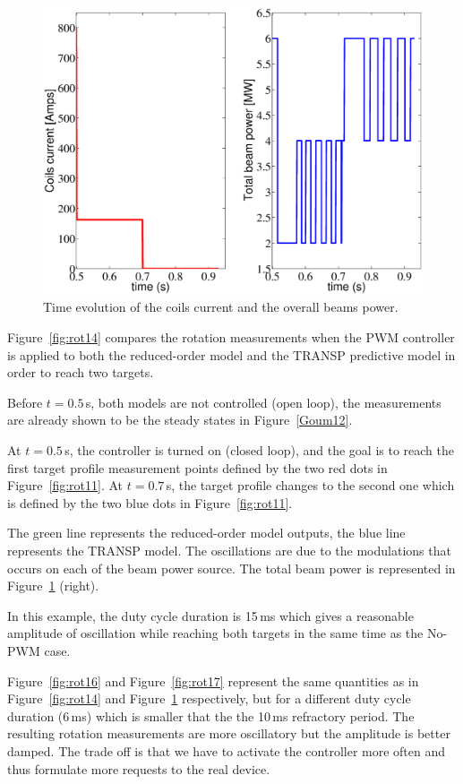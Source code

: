 \documentclass[12pt]{iopart}
\begin{document}
\begin{figure}
\centering
\includegraphics[width=\linewidth]{imene_figs/Goum15l}
\caption{Time evolution of the coils current and the overall beams power. }
\label{fig:rot15}
\end{figure}

Figure~\ref{fig:rot14} compares the rotation measurements when the PWM controller is applied to both the reduced-order model and the TRANSP predictive model in order to reach two targets.

Before $t=0.5$\,s, both models are not controlled (open loop), the measurements are already shown to be the steady states in Figure~\ref{Goum12}.

At $t = 0.5$\,s, the controller is turned on (closed loop), and the goal is to reach the first target profile measurement points defined by the two red dots in Figure~\ref{fig:rot11}. At $t = 0.7$\,s, the  target profile changes to the second one which is defined by the two blue dots in Figure~\ref{fig:rot11}.

The green line represents the reduced-order model outputs, the blue line represents the TRANSP model. The oscillations are due to the modulations that occurs on each of the beam power source. The total beam power is represented in Figure~\ref{fig:rot15} (right).

In this example, the duty cycle duration is 15\,ms which gives a reasonable amplitude of oscillation while reaching both targets in the same time as the No-PWM case.

Figure~\ref{fig:rot16} and Figure~\ref{fig:rot17} represent the same quantities as in Figure~\ref{fig:rot14} and Figure~\ref{fig:rot15} respectively, but for a different duty cycle duration (6\,ms) which is smaller that the the 10\,ms refractory period.
The resulting rotation measurements are more oscillatory but the amplitude is better damped. The trade off is that we have to activate the controller more often and thus formulate more requests to the real device.
\end{document}
